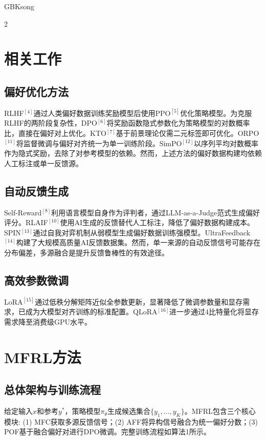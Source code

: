\begin{CJK*}{GBK}{song}
\begin{multicols}{2}
\section{相关工作}

\subsection{偏好优化方法}

RLHF$^{[4]}$通过人类偏好数据训练奖励模型后使用PPO$^{[5]}$优化策略模型。为克服RLHF的两阶段复杂性，DPO$^{[6]}$将奖励函数隐式参数化为策略模型的对数概率比，直接在偏好对上优化。KTO$^{[7]}$基于前景理论仅需二元标签即可优化。ORPO$^{[11]}$将监督微调与偏好对齐统一为单一训练阶段。SimPO$^{[12]}$以序列平均对数概率作为隐式奖励，去除了对参考模型的依赖。然而，上述方法的偏好数据构建均依赖人工标注或单一反馈源。

\subsection{自动反馈生成}

Self-Reward$^{[8]}$利用语言模型自身作为评判者，通过LLM-as-a-Judge范式生成偏好评分。RLAIF$^{[10]}$使用AI生成的反馈替代人工标注，降低了偏好数据构建成本。SPIN$^{[13]}$通过自我对弈机制从弱模型生成偏好数据训练强模型。UltraFeedback$^{[14]}$构建了大规模高质量AI反馈数据集。然而，单一来源的自动反馈信号可能存在分布偏差，多源融合是提升反馈鲁棒性的有效途径。

\subsection{高效参数微调}

LoRA$^{[15]}$通过低秩分解矩阵近似全参数更新，显著降低了微调参数量和显存需求，已成为大模型对齐训练的标准配置。QLoRA$^{[16]}$进一步通过4比特量化将显存需求降至消费级GPU水平。

\section{MFRL方法}

\subsection{总体架构与训练流程}

给定输入$x$和参考$y^*$，策略模型$\pi_\theta$生成候选集合$\{y_1,\dots,y_K\}$。MFRL包含三个核心模块: (1) MFC获取多源反馈信号；(2) AFF将异构信号融合为统一偏好分数；(3) POF基于融合偏好对进行DPO微调。完整训练流程如算法1所示。


\end{multicols}
\end{CJK*}
